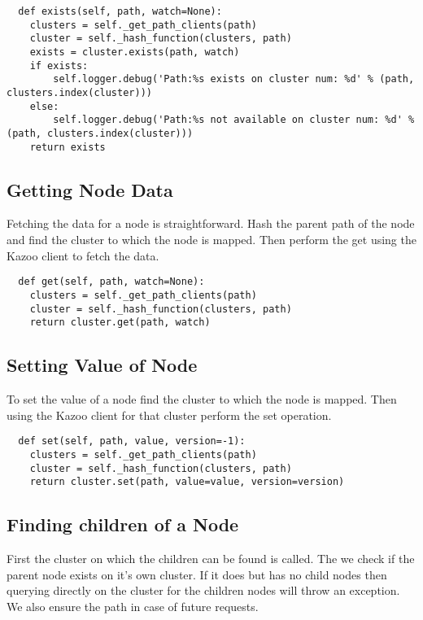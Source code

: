\begin{lstlisting}
  def exists(self, path, watch=None):
    clusters = self._get_path_clients(path)
    cluster = self._hash_function(clusters, path)
    exists = cluster.exists(path, watch)
    if exists:
        self.logger.debug('Path:%s exists on cluster num: %d' % (path, clusters.index(cluster)))
    else:
        self.logger.debug('Path:%s not available on cluster num: %d' % (path, clusters.index(cluster)))
    return exists
\end{lstlisting}

\subsection{Getting Node Data}
Fetching the data for a node is straightforward. Hash the parent path of the node and find the cluster to which the node is mapped. Then perform the get using the Kazoo client to fetch the data.

\begin{lstlisting}
  def get(self, path, watch=None):
    clusters = self._get_path_clients(path)
    cluster = self._hash_function(clusters, path)
    return cluster.get(path, watch)
\end{lstlisting}


\subsection{Setting Value of Node}
To set the value of a node find the cluster to which the node is mapped. Then using the Kazoo client for that cluster perform the set operation. 

\begin{lstlisting}
  def set(self, path, value, version=-1):
    clusters = self._get_path_clients(path)
    cluster = self._hash_function(clusters, path)
    return cluster.set(path, value=value, version=version)
\end{lstlisting}

\subsection{Finding children of a Node}
    First the cluster on which the children can be found is called. The we check if the parent node exists on it's own cluster. If it does but has no child nodes then querying directly on the cluster for the children nodes will throw an exception. We also ensure the path in case of future requests.


